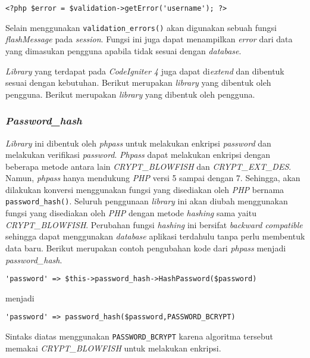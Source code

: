 \begin{center}
\verb|<?php $error = $validation->getError('username'); ?>|
\end{center}

Selain menggunakan \texttt{validation\_errors()} akan digunakan sebuah fungsi \textit{flashMessage} pada \textit{session}. Fungsi ini juga dapat menampilkan \textit{error} dari data yang dimasukan pengguna apabila tidak sesuai dengan \textit{database}.

\textit{Library} yang terdapat pada \textit{CodeIgniter 4} juga dapat di\textit{extend} dan dibentuk sesuai dengan kebutuhan. Berikut merupakan \textit{library} yang dibentuk oleh pengguna. Berikut merupakan \textit{library} yang dibentuk oleh pengguna.

\subsubsection{\textit{Password\_hash}}
\textit{Library} ini dibentuk oleh \textit{phpass} untuk melakukan enkripsi \textit{password} dan melakukan verifikasi \textit{password}. \textit{Phpass} dapat melakukan enkripsi dengan beberapa metode antara lain \textit{CRYPT\_BLOWFISH} dan \textit{CRYPT\_EXT\_DES}. Namun, \textit{phpass} hanya mendukung \textit{PHP} versi 5 sampai dengan 7. Sehingga, akan dilakukan konversi menggunakan fungsi yang disediakan oleh \textit{PHP} bernama \texttt{password\_hash()}. Seluruh penggunaan \textit{library} ini akan diubah menggunakan fungsi yang disediakan oleh \textit{PHP} dengan metode \textit{hashing} sama yaitu \textit{CRYPT\_BLOWFISH}. Perubahan fungsi \textit{hashing} ini bersifat \textit{backward compatible} sehingga dapat menggunakan \textit{database} aplikasi terdahulu tanpa perlu membentuk data baru. Berikut merupakan contoh pengubahan kode dari \textit{phpass} menjadi \textit{password\_hash}.

\begin{center}
\verb|'password' => $this->password_hash->HashPassword($password)|
\end{center}
menjadi
\begin{center}
\verb|'password' => password_hash($password,PASSWORD_BCRYPT)|
\end{center}

Sintaks diatas menggunakan \texttt{PASSWORD\_BCRYPT} karena algoritma tersebut memakai \textit{CRYPT\_BLOWFISH} untuk melakukan enkripsi.


